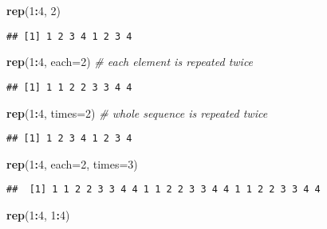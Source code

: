 \documentclass[]{book}
\newenvironment{Shaded}{\begin{snugshade}}{\end{snugshade}}
\newcommand{\CommentTok}[1]{\textcolor[rgb]{0.56,0.35,0.01}{\textit{#1}}}
\newcommand{\DataTypeTok}[1]{\textcolor[rgb]{0.13,0.29,0.53}{#1}}
\newcommand{\DecValTok}[1]{\textcolor[rgb]{0.00,0.00,0.81}{#1}}
\newcommand{\KeywordTok}[1]{\textcolor[rgb]{0.13,0.29,0.53}{\textbf{#1}}}
\newcommand{\NormalTok}[1]{#1}
\newcommand{\OperatorTok}[1]{\textcolor[rgb]{0.81,0.36,0.00}{\textbf{#1}}}
\begin{document}
\begin{Shaded}
\begin{Highlighting}[]
\KeywordTok{rep}\NormalTok{(}\DecValTok{1}\OperatorTok{:}\DecValTok{4}\NormalTok{, }\DecValTok{2}\NormalTok{)}
\end{Highlighting}
\end{Shaded}

\begin{verbatim}
## [1] 1 2 3 4 1 2 3 4
\end{verbatim}

\begin{Shaded}
\begin{Highlighting}[]
\KeywordTok{rep}\NormalTok{(}\DecValTok{1}\OperatorTok{:}\DecValTok{4}\NormalTok{, }\DataTypeTok{each=}\DecValTok{2}\NormalTok{) }\CommentTok{# each element is repeated twice}
\end{Highlighting}
\end{Shaded}

\begin{verbatim}
## [1] 1 1 2 2 3 3 4 4
\end{verbatim}

\begin{Shaded}
\begin{Highlighting}[]
\KeywordTok{rep}\NormalTok{(}\DecValTok{1}\OperatorTok{:}\DecValTok{4}\NormalTok{, }\DataTypeTok{times=}\DecValTok{2}\NormalTok{) }\CommentTok{# whole sequence is repeated twice}
\end{Highlighting}
\end{Shaded}

\begin{verbatim}
## [1] 1 2 3 4 1 2 3 4
\end{verbatim}

\begin{Shaded}
\begin{Highlighting}[]
\KeywordTok{rep}\NormalTok{(}\DecValTok{1}\OperatorTok{:}\DecValTok{4}\NormalTok{, }\DataTypeTok{each=}\DecValTok{2}\NormalTok{, }\DataTypeTok{times=}\DecValTok{3}\NormalTok{)}
\end{Highlighting}
\end{Shaded}

\begin{verbatim}
##  [1] 1 1 2 2 3 3 4 4 1 1 2 2 3 3 4 4 1 1 2 2 3 3 4 4
\end{verbatim}

\begin{Shaded}
\begin{Highlighting}[]
\KeywordTok{rep}\NormalTok{(}\DecValTok{1}\OperatorTok{:}\DecValTok{4}\NormalTok{, }\DecValTok{1}\OperatorTok{:}\DecValTok{4}\NormalTok{)}
\end{Highlighting}
\end{Shaded}
\end{document}

